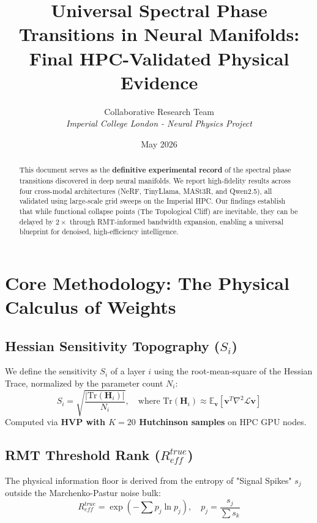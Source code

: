 \documentclass[11pt,a4paper]{article}
\title{\textbf{Universal Spectral Phase Transitions in Neural Manifolds: \\ Final HPC-Validated Physical Evidence}}
\author{Collaborative Research Team \\ \textit{Imperial College London - Neural Physics Project}}
\date{May 2026}
\begin{document}
\maketitle

\begin{abstract}
    This document serves as the \textbf{definitive experimental record} of the spectral phase transitions discovered in deep neural manifolds. We report high-fidelity results across four cross-modal architectures (NeRF, TinyLlama, MASt3R, and Qwen2.5), all validated using large-scale grid sweeps on the Imperial HPC. Our findings establish that while functional collapse points (The Topological Cliff) are inevitable, they can be delayed by $2\times$ through RMT-informed bandwidth expansion, enabling a universal blueprint for denoised, high-efficiency intelligence.
\end{abstract}

\tableofcontents
\newpage

\section{Core Methodology: The Physical Calculus of Weights}

\subsection{Hessian Sensitivity Topography ($S_i$)}
We define the sensitivity $S_i$ of a layer $i$ using the root-mean-square of the Hessian Trace, normalized by the parameter count $N_i$:
\begin{equation}
    S_i = \sqrt{\frac{|\text{Tr}(\mathbf{H}_i)|}{N_i}}, \quad \text{where } \text{Tr}(\mathbf{H}_i) \approx \mathbb{E}_{\mathbf{v}} [\mathbf{v}^T \nabla^2 \mathcal{L} \mathbf{v}]
\end{equation}
Computed via \textbf{HVP with $K=20$ Hutchinson samples} on HPC GPU nodes.

\subsection{RMT Threshold Rank ($R_{eff}^{true}$)}
The physical information floor is derived from the entropy of "Signal Spikes" $s_j$ outside the Marchenko-Pastur noise bulk:
\begin{equation}
    R_{eff}^{true} = \exp\left( -\sum p_j \ln p_j \right), \quad p_j = \frac{s_j}{\sum s_k}
\end{equation}
\end{document}
